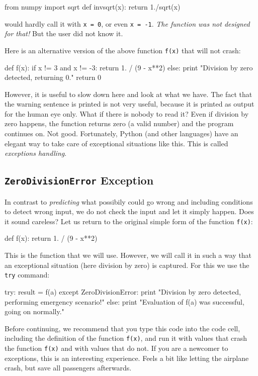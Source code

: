 \begin{bluecode}
from numpy import sqrt
def invsqrt(x):
    return 1./sqrt(x)
\end{bluecode}
would hardly call it with {\tt x = 0}, or even {\tt x = -1}. {\em The function 
was not designed for that!} But the user did not know it.

Here is an alternative version of the above function {\tt f(x)} that will not crash:

\begin{bluecode}
def f(x):
    if x != 3 and x != -3:
        return 1. / (9 - x**2)
    else:
        print "Division by zero detected, returning 0."
        return 0
\end{bluecode}
However, it is useful to slow down here and look at what we have. The fact that
the warning sentence is printed is not very useful, because it is printed as output for 
the human eye only. What if there is nobody to read it? Even if division by zero 
happens, the function returns zero (a valid number) and the program continues on.
Not good. Fortunately,
Python (and other languages) have an elegant way to take care of exceptional situations 
like this. This is called {\em exceptions handling}.

\subsection{{\tt ZeroDivisionError} Exception}

In contrast 
to {\em predicting} what possibily could go wrong and including conditions to detect wrong 
input, we do not check the input and let it simply happen. Does it sound careless? Let us 
return to the original simple form of the function {\tt f(x)}:

\begin{bluecode}
def f(x):
    return 1. / (9 - x**2)
\end{bluecode}
This is the function that we will use. However, we will call it in such a way that 
an exceptional situation (here division by zero) is captured. For this we use the 
{\tt try} command:
 
\begin{bluecode}
try:
    result = f(a)
except ZeroDivisionError:
    print "Division by zero detected, performing emergency scenario!"
else:
    print "Evaluation of f(a) was successful, going on normally."
\end{bluecode}
Before continuing, we recommend that you type this code into the code cell,
including the definition of the function {\tt f(x)}, and run it with values
that crash the function {\tt f(x)} and with values that do not. If you are a newcomer to
exceptions, this is an interesting experience. Feels a bit like letting the
airplane crash, but save all passengers afterwards.
 
